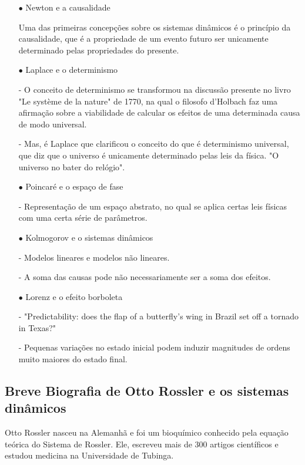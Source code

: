 \documentclass[12pt,a4paper]{article} %
\theoremstyle{definition}
\numberwithin{equation}{ex}
\theoremstyle{definition}
\begin{document}
\begin{itemize}
	\item [$\bullet$] Newton e a causalidade
	
	Uma das primeiras concepções sobre os sistemas dinâmicos é o princípio da causalidade, que é a propriedade de um evento futuro ser  unicamente determinado pelas propriedades do presente.
	
	\item [$\bullet$]  Laplace e o determinismo
	
	- O conceito de determinismo se transformou na discussão presente no livro "Le système de la nature" de 1770, na qual o filosofo d'Holbach faz uma afirmação sobre a viabilidade de calcular os efeitos de uma determinada causa de modo universal.
	
	- Mas, é Laplace que clarificou o conceito do que é determinismo universal, que diz que o universo é unicamente determinado pelas leis da física. "O universo no bater do relógio".
	
	\item [$\bullet$] Poincaré e o espaço de fase
	
	- Representação de um espaço abstrato, no qual se aplica certas leis físicas com uma certa série de parâmetros.
		
	\item [$\bullet$] Kolmogorov e o sistemas dinâmicos
	
	- Modelos lineares e modelos não lineares.
	
	- A soma das causas pode não necessariamente ser a soma dos efeitos.
		
	\item [$\bullet$] Lorenz e o efeito borboleta
		
	- "Predictability: does the flap of a butterfly's wing in Brazil set off a tornado in Texas?"
		
	- Pequenas variações no estado inicial podem induzir magnitudes de ordens muito maiores do estado final.
	
\end{itemize}

\subsection{Breve Biografia de Otto Rossler e os sistemas dinâmicos}

	Otto Rossler nasceu na Alemanhã e foi um bioquímico conhecido pela equação teórica do Sistema de Rossler. Ele, escreveu mais de 300 artigos científicos e estudou medicina na Universidade de Tubinga.
	
\end{document}
